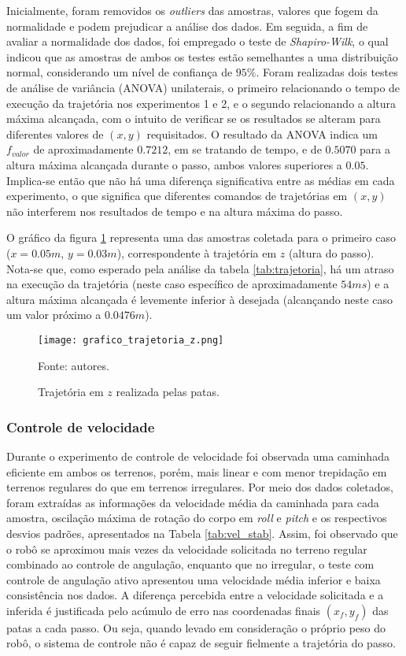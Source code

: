 \documentclass[../main.tex]{subfiles}
\begin{document}
  Inicialmente, foram removidos os \textit{outliers} das amostras, valores que fogem da normalidade e podem prejudicar a análise dos dados. Em seguida, a fim de avaliar a normalidade dos dados, foi empregado o teste de \textit{Shapiro-Wilk}, o qual indicou que as amostras de ambos os testes estão semelhantes a uma distribuição normal, considerando um nível de confiança de $95\%$.  Foram realizadas dois testes de análise de variância (ANOVA) unilaterais, o primeiro relacionando o tempo de execução da trajetória nos experimentos 1 e 2, e o segundo relacionando a altura máxima alcançada, com o intuito de verificar se os resultados se alteram para diferentes valores de $(x, y)$ requisitados. O resultado da ANOVA indica um $f_{valor}$ de aproximadamente $0.7212$, em se tratando de tempo, e de $0.5070$ para a altura máxima alcançada durante o passo, ambos valores superiores a $0.05$. Implica-se então que não há uma diferença significativa entre as médias em cada experimento, o que significa que diferentes comandos de trajetórias em $(x, y)$ não interferem nos resultados de tempo e na altura máxima do passo.

  O gráfico da figura \ref{fig:grafico_trajetoria_xyz} representa uma das amostras coletada para o primeiro caso ($x=0.05m$, $y=0.03m$), correspondente à trajetória em $z$ (altura do passo). Nota-se que, como esperado pela análise da tabela \ref{tab:trajetoria}, há um atraso na execução da trajetória (neste caso específico de aproximadamente $54ms$) e a altura máxima alcançada é levemente inferior à desejada (alcançando neste caso um valor próximo a $0.0476m$).

  \begin{figure}[!htb]
    \centering
    \caption{Trajetória em $z$ realizada pelas patas.}
    \texttt{[image: grafico\_trajetoria\_z.png]}
  
    Fonte: autores.
    \label{fig:grafico_trajetoria_xyz}
  \end{figure}

  \subsubsection{Controle de velocidade}
  Durante o experimento de controle de velocidade foi observada uma caminhada eficiente em ambos os terrenos, porém, mais linear e com menor trepidação em terrenos regulares do que em terrenos irregulares. Por meio dos dados coletados, foram extraídas as informações da velocidade média da caminhada para cada amostra, oscilação máxima de rotação do corpo em \textit{roll} e \textit{pitch} e os respectivos desvios padrões, apresentados na Tabela \ref{tab:vel_stab}. Assim, foi observado que o robô se aproximou mais vezes da velocidade solicitada no terreno regular combinado ao controle de angulação, enquanto que no irregular, o teste com controle de angulação ativo apresentou uma velocidade média inferior e baixa consistência nos dados. A diferença percebida entre a velocidade solicitada e a inferida é justificada pelo acúmulo de erro nas coordenadas finais $(x_f, y_f)$ das patas a cada passo. Ou seja, quando levado em consideração o próprio peso do robô, o sistema de controle não é capaz de seguir fielmente a trajetória do passo.
\end{document}
